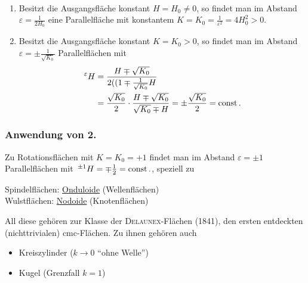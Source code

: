 \begin{folgerung}\(\)
 \begin{enumerate}
  \item Besitzt die Ausgangsfläche konstant \(H = H_0 \ne 0\), so findet man im Abstand \(\varepsilon = \frac{1}{2 H_0}\) eine Parallelfläche mit konstantem \(K = K_0 = \frac{1}{\varepsilon^2} = 4 H_0^2 > 0\).
  \item Besitzt die Ausgangsfläche konstant \(K = K_0 > 0\), so findet man im Abstand \(\varepsilon = \pm \frac{1}{\sqrt{K_0}}\) Parallelflächen mit
  \begin{align*}
   \,^\varepsilon H &= \frac{H \mp \sqrt{K_0}}{2((1 \mp \frac{1}{\sqrt{K_0}} H} \\
   &= \frac{\sqrt{K_0}}{2} \cdot \frac{H \mp \sqrt{K_0}}{\sqrt{K_0} \mp H} = \pm \frac{\sqrt{K_0}} 	{2} = \operatorname{const}.
  \end{align*}
 \end{enumerate}
\end{folgerung}

\subsubsection{Anwendung von 2.}
Zu Rotationsflächen mit \(K = K_0 = + 1\) findet man im Abstand \(\varepsilon = \pm 1\) Parallelflächen mit \(\,^{\pm 1}H = \mp \frac12 = \operatorname{const}.\), speziell zu \par
Spindelflächen: \uline{Onduloide} (Wellenflächen) \\
Wulstflächen: \uline{Nodoide} (Knotenflächen) \par

All diese gehören zur Klasse der \textsc{Delaunex}-Flächen (1841), den ersten entdeckten (nichttrivialen) cmc-Flächen. Zu ihnen gehören auch
\begin{itemize}
 \item Kreiszylinder (\(k \to 0\) ``ohne Welle'')
 \item Kugel (Grenzfall \(k = 1\))
\end{itemize}


